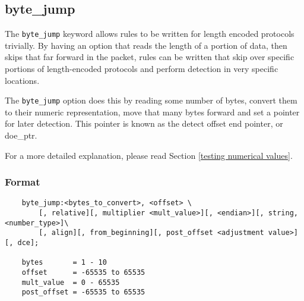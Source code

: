 \documentclass[english]{report}
\begin{document}
\subsection{byte\_jump}
\label{sub:byte_jump}

The \texttt{byte\_jump} keyword allows rules to be written for length encoded
protocols trivially. By having an option that reads the length of a portion of
data, then skips that far forward in the packet, rules can be written that skip
over specific portions of length-encoded protocols and perform detection in
very specific locations.

The \texttt{byte\_jump} option does this by reading some number of bytes,
convert them to their numeric representation, move that many bytes forward and
set a pointer for later detection.  This pointer is known as the detect offset
end pointer, or doe\_ptr.

For a more detailed explanation, please read Section \ref{testing numerical
values}.

\subsubsection{Format}

\begin{verbatim}
    byte_jump:<bytes_to_convert>, <offset> \
        [, relative][, multiplier <mult_value>][, <endian>][, string, <number_type>]\
        [, align][, from_beginning][, post_offset <adjustment value>][, dce];

    bytes       = 1 - 10
    offset      = -65535 to 65535
    mult_value  = 0 - 65535
    post_offset = -65535 to 65535
    
\end{verbatim}
\end{document}
